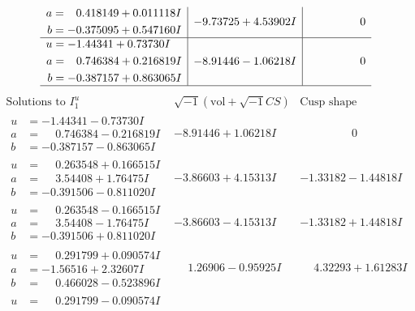 \documentclass[1p]{elsarticle_modified}
\theoremstyle{definition}
\newcommand{\I}{\sqrt{-1}}
\begin{document}
$$\begin{array}{c|c|c}
\begin{aligned}
a &= \phantom{-}0.418149 + 0.011118 I \\
b &= -0.375095 + 0.547160 I\end{aligned}
 & -9.73725 + 4.53902 I & \phantom{-0.000000 } 0 \\ \hline\begin{aligned}
u &= -1.44341 + 0.73730 I \\
a &= \phantom{-}0.746384 + 0.216819 I \\
b &= -0.387157 + 0.863065 I\end{aligned}
 & -8.91446 - 1.06218 I & \phantom{-0.000000 } 0\\
 \hline 
 \end{array}$$\newpage$$\begin{array}{c|c|c}  
\text{Solutions to }I^u_{1}& \I (\text{vol} + \sqrt{-1}CS) & \text{Cusp shape}\\
 \hline 
\begin{aligned}
u &= -1.44341 - 0.73730 I \\
a &= \phantom{-}0.746384 - 0.216819 I \\
b &= -0.387157 - 0.863065 I\end{aligned}
 & -8.91446 + 1.06218 I & \phantom{-0.000000 } 0 \\ \hline\begin{aligned}
u &= \phantom{-}0.263548 + 0.166515 I \\
a &= \phantom{-}3.54408 + 1.76475 I \\
b &= -0.391506 - 0.811020 I\end{aligned}
 & -3.86603 + 4.15313 I & -1.33182 - 1.44818 I \\ \hline\begin{aligned}
u &= \phantom{-}0.263548 - 0.166515 I \\
a &= \phantom{-}3.54408 - 1.76475 I \\
b &= -0.391506 + 0.811020 I\end{aligned}
 & -3.86603 - 4.15313 I & -1.33182 + 1.44818 I \\ \hline\begin{aligned}
u &= \phantom{-}0.291799 + 0.090574 I \\
a &= -1.56516 + 2.32607 I \\
b &= \phantom{-}0.466028 - 0.523896 I\end{aligned}
 & \phantom{-}1.26906 - 0.95925 I & \phantom{-}4.32293 + 1.61283 I \\ \hline\begin{aligned}
u &= \phantom{-}0.291799 - 0.090574 I \\

\end{aligned}
\end{array}$$
\end{document}
